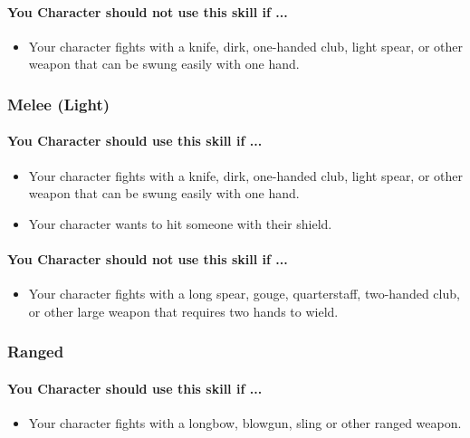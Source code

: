 \begin{multicols}{2}
\paragraph{You Character should not use this skill if ...}
\begin{itemize}
    \item Your character fights with a knife, dirk, one-handed club, light spear,
        or other weapon that can be swung easily with one hand.
\end{itemize}

\subsubsection{Melee (Light)}\label{skill:melee_light}
\paragraph{You Character should use this skill if ...}
\begin{itemize}
    \item Your character fights with a knife, dirk, one-handed club, light spear,
        or other weapon that can be swung easily with one hand.
    \item Your character wants to hit someone with their shield.
\end{itemize}
\paragraph{You Character should not use this skill if ...}
\begin{itemize}
    \item Your character fights with a long spear, gouge, quarterstaff, two-handed
        club, or other large weapon that requires two hands to wield.
\end{itemize}

\subsubsection{Ranged}\label{skill:ranged}
\paragraph{You Character should use this skill if ...}
\begin{itemize}
    \item Your character fights with a longbow, blowgun, sling or other ranged weapon.
\end{itemize}

\end{multicols}
